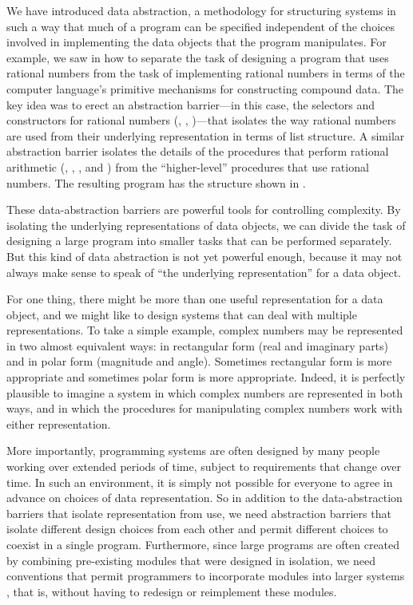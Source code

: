 We have introduced data abstraction, a methodology for structuring systems in
such a way that much of a program can be specified independent of the choices
involved in implementing the data objects that the program manipulates.  For
example, we saw in  how to separate the task of designing a
program that uses rational numbers from the task of implementing rational
numbers in terms of the computer language's primitive mechanisms for
constructing compound data.  The key idea was to erect an abstraction
barrier---in this case, the selectors and constructors for rational numbers
(, , )---that isolates the way rational
numbers are used from their underlying representation in terms of list
structure.  A similar abstraction barrier isolates the details of the
procedures that perform rational arithmetic (, ,
, and ) from the ``higher-level'' procedures that
use rational numbers.  The resulting program has the structure shown in
.

These data-abstraction barriers are powerful tools for controlling complexity.
By isolating the underlying representations of data objects, we can divide the
task of designing a large program into smaller tasks that can be performed
separately.  But this kind of data abstraction is not yet powerful enough,
because it may not always make sense to speak of ``the underlying
representation'' for a data object.

For one thing, there might be more than one useful representation for a data
object, and we might like to design systems that can deal with multiple
representations.  To take a simple example, complex numbers may be represented
in two almost equivalent ways: in rectangular form (real and imaginary parts)
and in polar form (magnitude and angle).  Sometimes rectangular form is more
appropriate and sometimes polar form is more appropriate.  Indeed, it is
perfectly plausible to imagine a system in which complex numbers are
represented in both ways, and in which the procedures for manipulating complex
numbers work with either representation.

More importantly, programming systems are often designed by many people working
over extended periods of time, subject to requirements that change over time.
In such an environment, it is simply not possible for everyone to agree in
advance on choices of data representation.  So in addition to the
data-abstraction barriers that isolate representation from use, we need
abstraction barriers that isolate different design choices from each other and
permit different choices to coexist in a single program.  Furthermore, since
large programs are often created by combining pre-existing modules that were
designed in isolation, we need conventions that permit programmers to
incorporate modules into larger systems , that is, without
having to redesign or reimplement these modules.

